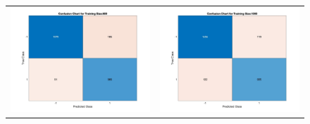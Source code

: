 \documentclass[11pt]{article}
\begin{document}
\begin{figure}[H]
\begin{adjustbox}{width=0.9\paperwidth}
\begin{tabular}{c c}
			\includegraphics{Codes/Results/Logistic Train/Conf_Chart_Train_Size_800} & \includegraphics{Codes/Results/Logistic Train/Conf_Chart_Train_Size_1000}\\

\end{tabular}
\end{adjustbox}
\end{figure}
\end{document}
